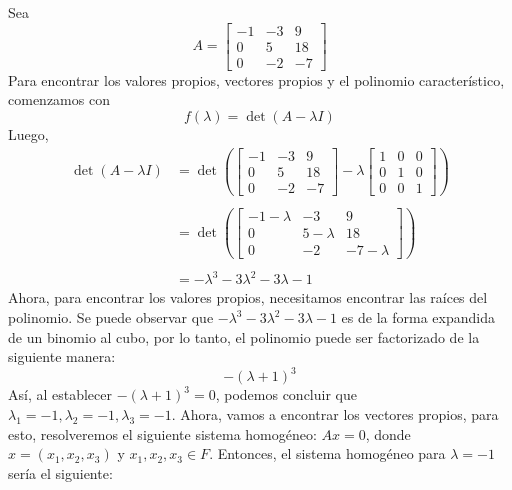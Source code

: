 \documentclass{report}
\begin{document}
    \begin{Example}
        Sea
        $$A = \begin{bmatrix}
            -1 & -3 & 9\\
            0 & 5 & 18\\
            0 & -2 & -7
        \end{bmatrix}$$
        Para encontrar los valores propios, vectores propios y el polinomio característico, comenzamos con
        $$f(\lambda) = \det\left(A - \lambda I\right)$$
        Luego, \begin{align*}
            \det\left(A - \lambda I\right) &= \det\left(
                \begin{bmatrix}
                    -1 & -3 & 9\\
                    0 & 5 & 18\\
                    0 & -2 & -7
                \end{bmatrix}
            - \lambda
                \begin{bmatrix}
                    1 & 0 & 0\\
                    0 & 1 & 0\\
                    0 & 0 & 1
                \end{bmatrix}
            \right)\\\\
            &= \det\left(
                \begin{bmatrix}
                    -1-\lambda & -3 & 9\\
                    0 & 5-\lambda & 18\\
                    0 & -2 & -7-\lambda
                \end{bmatrix}
            \right)\\\\
            &= -\lambda^3 -3\lambda^2 -3\lambda -1
        \end{align*}
        Ahora, para encontrar los valores propios, necesitamos encontrar las raíces del polinomio. Se puede observar que $-\lambda^3 -3\lambda^2 -3\lambda -1$ es de la forma expandida de un binomio al cubo, por lo tanto, el polinomio puede ser factorizado de la siguiente manera:
        $$-(\lambda + 1)^3$$
        Así, al establecer $-(\lambda + 1)^3 = 0$, podemos concluir que $\lambda_1 = -1, \lambda_2 = -1, \lambda_3 = -1$. Ahora, vamos a encontrar los vectores propios, para esto, resolveremos el siguiente sistema homogéneo: $Ax = 0$, donde $x = (x_1, x_2, x_3)$ y $x_1, x_2, x_3 \in F$. Entonces, el sistema homogéneo para $\lambda = -1$ sería el siguiente:

\end{Example}
\end{document}
